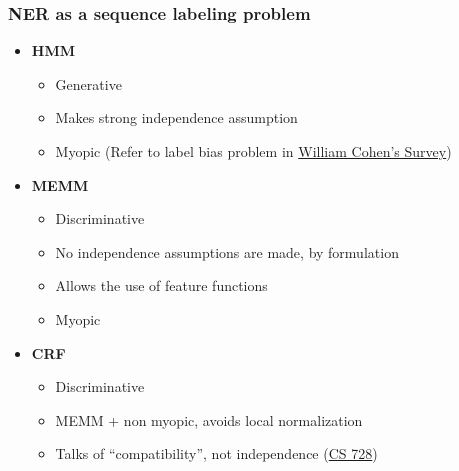 \begin{frame}
 \frametitle{NER as a sequence labeling problem}
 \begin{itemize}
 \item \textbf{HMM} 
 \begin{itemize}
 \item Generative
 \item Makes strong independence assumption
 \item Myopic (Refer to label bias problem in \hyperref[thesurvey]{William Cohen's Survey})
 \end{itemize}
 
 \item \textbf{MEMM}
 \begin{itemize}
 \item Discriminative
 \item No independence assumptions are made, by formulation
 \item Allows the use of feature functions
 \item Myopic
 \end{itemize}
 
 \item \textbf{CRF}
 \begin{itemize}
  \item Discriminative
  \item MEMM + non myopic, avoids local normalization
  \item Talks of ``compatibility'', not independence (\hyperref[thesite]{CS 728})
 \end{itemize}

 
 \end{itemize}
 
\end{frame}